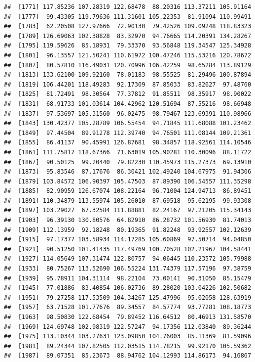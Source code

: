 \documentclass[
]{article}
\begin{document}
\begin{verbatim}
##  [1771] 117.85236 107.28319 122.68478  88.20316 113.37211 105.91164
##  [1777]  99.43305 119.79636 111.31601 105.22353  81.91094 110.99491
##  [1783]  62.20508 127.97666  72.90130  79.42526 109.09248 118.83323
##  [1789] 126.69063 102.38828  83.32970  94.76665 114.20391 134.28267
##  [1795] 119.59626  85.18931  79.33370  93.56848 119.34547 125.34928
##  [1801]  96.13557 121.50241 110.61972 100.47246 115.53216 120.78672
##  [1807]  80.57810 116.49031 120.70996 106.42259  98.65284 113.89129
##  [1813] 133.62100 109.92160  78.01183  98.55525  81.29496 100.87894
##  [1819] 106.44201 118.49283  92.17309  87.85033  83.82627  97.48760
##  [1825]  81.72491  98.30564  77.37812  91.85511  98.35917  98.90022
##  [1831]  68.91733 101.03614 104.42962 120.51694  87.55216  98.66948
##  [1837]  97.53697 105.31560  96.02475  98.79467 123.69391 110.98966
##  [1843] 130.42377 105.28789 106.55454  94.71845 111.68088 101.23462
##  [1849]  97.44504  89.91278 112.39740  94.76501 111.08144 109.21361
##  [1855]  86.41137  90.45991 126.87681  98.34857 118.92561 114.10546
##  [1861] 111.75817 118.67366  71.63019 105.90281 110.30096  88.11722
##  [1867]  90.50125  99.20440  79.82230 110.45973 115.27373  69.13910
##  [1873]  95.83546  87.17676  86.30421 102.49240 104.67975  91.94306
##  [1879] 103.84572 106.90397 105.47503  87.89390 106.54557 111.35298
##  [1885]  82.90959 126.67074 108.22164  96.71004 124.94713  86.89451
##  [1891] 110.34879 113.55974 105.26010  87.69518  95.62195  99.93308
##  [1897] 103.29027  67.32584 111.88881  82.24167  97.21205 115.34143
##  [1903]  96.39130 130.80576  64.82910  86.28732 101.56930  81.74013
##  [1909] 112.13959  92.18248  80.19365  91.82248  93.92557 102.12639
##  [1915]  97.17377 103.58934 114.17285 105.60869  97.50714  94.04850
##  [1921]  90.51250 101.41435 117.49769 100.70528 102.21967 104.58441
##  [1927] 114.05649 107.31474 122.80757  94.06445 110.23572 105.79988
##  [1933]  80.75267 113.52690 106.55224 131.74379 117.57196  97.38759
##  [1939]  95.78911 104.31114  98.22104  73.00141  90.31050  85.15479
##  [1945]  77.01886  83.40854 106.02736  89.28020 103.04226 102.50682
##  [1951]  79.27258 117.53509 104.34267 125.47996  95.02058 128.63919
##  [1957]  63.71528 101.77676  89.34557  84.57774  93.77281 108.18773
##  [1963]  98.50830 122.68454  79.89452 116.64512  80.46913 131.58570
##  [1969] 124.69748 102.98319 122.57247  94.17356 112.03840  89.36244
##  [1975] 113.10344 103.27631 123.09850 104.76003  85.11369  81.59096
##  [1981]  89.24344 107.82505 112.03515 114.78215  99.92170 105.59362
##  [1987]  89.07351  85.23673  88.94762 104.12993 114.86173  94.16867

\end{verbatim}
\end{document}
